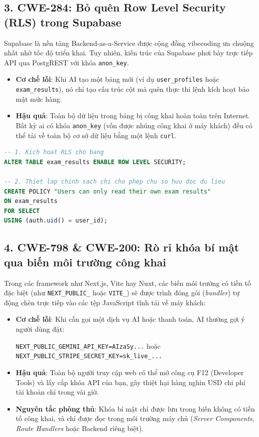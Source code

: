 \documentclass[a4paper,11pt]{article}
\begin{document}
\subsection{3. CWE-284: Bỏ quên Row Level Security (RLS) trong Supabase}
Supabase là nền tảng Backend-as-a-Service được cộng đồng vibecoding ưa chuộng nhất nhờ tốc độ triển khai. Tuy nhiên, kiến trúc của Supabase phơi bày trực tiếp API qua PostgREST với khóa \texttt{anon\_key}.
\begin{itemize}[leftmargin=1.5em]
    \item \textbf{Cơ chế lỗi}: Khi AI tạo một bảng mới (ví dụ \texttt{user\_profiles} hoặc \texttt{exam\_results}), nó chỉ tạo cấu trúc cột mà quên thực thi lệnh kích hoạt bảo mật mức hàng.
    \item \textbf{Hậu quả}: Toàn bộ dữ liệu trong bảng bị công khai hoàn toàn trên Internet. Bất kỳ ai có khóa \texttt{anon\_key} (vốn được nhúng công khai ở máy khách) đều có thể tải về toàn bộ cơ sở dữ liệu bằng một lệnh \texttt{curl}.
\end{itemize}

\begin{lstlisting}[language=sql, caption={Quy chuẩn kích hoạt RLS bắt buộc cho mọi bảng trong Supabase}]
-- 1. Kich hoat RLS cho bang
ALTER TABLE exam_results ENABLE ROW LEVEL SECURITY;

-- 2. Thiet lap chinh sach chi cho phep chu so huu doc du lieu
CREATE POLICY "Users can only read their own exam results"
ON exam_results
FOR SELECT
USING (auth.uid() = user_id);
\end{lstlisting}

\subsection{4. CWE-798 \& CWE-200: Rò rỉ khóa bí mật qua biến môi trường công khai}
Trong các framework như Next.js, Vite hay Nuxt, các biến môi trường có tiền tố đặc biệt (như \texttt{NEXT\_PUBLIC\_} hoặc \texttt{VITE\_}) sẽ được trình đóng gói (\textit{bundler}) tự động chèn trực tiếp vào các tệp JavaScript tĩnh tải về máy khách:
\begin{itemize}[leftmargin=1.5em]
    \item \textbf{Cơ chế lỗi}: Khi cần gọi một dịch vụ AI hoặc thanh toán, AI thường gợi ý người dùng đặt:
    \begin{center}
    \texttt{NEXT\_PUBLIC\_GEMINI\_API\_KEY=AIzaSy...} hoặc \texttt{NEXT\_PUBLIC\_STRIPE\_SECRET\_KEY=sk\_live\_...}
    \end{center}
    \item \textbf{Hậu quả}: Toàn bộ người truy cập web có thể mở công cụ F12 (Developer Tools) và lấy cắp khóa API của bạn, gây thiệt hại hàng nghìn USD chi phí tài khoản chỉ trong vài giờ.
    \item \textbf{Nguyên tắc phòng thủ}: Khóa bí mật chỉ được lưu trong biến không có tiền tố công khai, và chỉ được đọc trong môi trường máy chủ (\textit{Server Components}, \textit{Route Handlers} hoặc Backend riêng biệt).
\end{itemize}
\end{document}
